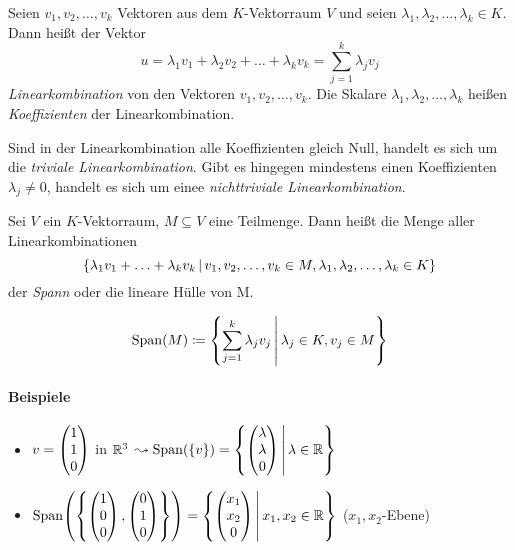 Seien $v_1,v_2,\ldots,v_k$ Vektoren aus dem $K$-Vektorraum $V$ und seien $\lambda_1,\lambda_2,\ldots,\lambda_k \in K$. Dann heißt der Vektor
\begin{equation*}
  u=\lambda_1v_1+\lambda_2v_2+\ldots+\lambda_kv_k = \sum\limits_{j=1}^k\lambda_jv_j
\end{equation*}
\emph{Linearkombination} von den Vektoren $v_1,v_2,\ldots,v_k$.
Die Skalare $\lambda_1,\lambda_2,\ldots,\lambda_k$ heißen \emph{Koeffizienten} der Linearkombination.

Sind in der Linearkombination alle Koeffizienten gleich Null, handelt es sich um die \emph{triviale Linearkombination}. Gibt es hingegen mindestens einen Koeffizienten $\lambda_j \neq 0$, handelt es sich um einee \emph{nichttriviale Linearkombination}.


Sei $V$ ein $K$-Vektorraum, $M\subseteq V$ eine Teilmenge. Dann heißt die Menge aller Linearkombinationen
\begin{equation*}
  \left\{ \lambda_1v_1+\ldots+\lambda_kv_k \,\middle|\, v_1,v_2,\ldots,v_k \in M, \lambda_1,\lambda_2,\ldots,\lambda_k \in K \right\}
\end{equation*}
der \emph{Spann} oder die lineare Hülle von M.

\begin{equation*}
  \mathrm{Span}\! \left(M\right)\coloneqq \left\{ \sum\limits_{j=1}^k\lambda_jv_j \,\middle|\, \lambda_j \in K, v_j\in M \right\}
\end{equation*}

\paragraph{Beispiele}
\begin{itemize}
  \item $v=\begin{pmatrix} 1\\1\\0 \end{pmatrix}$ in $\mathbb{R}^3$ $\leadsto \mathrm{Span}\! \left(\{v\}\right) = \left\{ \begin{pmatrix} \lambda\\\lambda\\0 \end{pmatrix} \,\middle|\, \lambda \in \mathbb{R} \right\}$
  \item $\mathrm{Span}\! \left(\left\{ \begin{pmatrix} 1\\0\\0 \end{pmatrix},\begin{pmatrix} 0\\1\\0 \end{pmatrix} \right\}\right) = \left\{ \begin{pmatrix} x_1\\x_2\\0 \end{pmatrix} \,\middle|\, x_1,x_2\in\mathbb{R} \right\}$ ($x_1,x_2$-Ebene)
\end{itemize}

